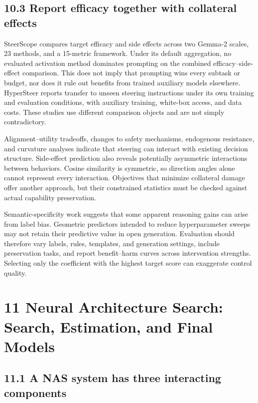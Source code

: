 \subsection*{10.3 Report efficacy together with collateral effects}

SteerScope compares target efficacy and side effects across two Gemma-2 scales, 23 methods, and a 15-metric framework.\cite{r87} Under its default aggregation, no evaluated activation method dominates prompting on the combined efficacy–side-effect comparison. This does not imply that prompting wins every subtask or budget, nor does it rule out benefits from trained auxiliary models elsewhere. HyperSteer reports transfer to unseen steering instructions under its own training and evaluation conditions, with auxiliary training, white-box access, and data costs.\cite{r110} These studies use different comparison objects and are not simply contradictory.


Alignment–utility tradeoffs, changes to safety mechanisms, endogenous resistance, and curvature analyses indicate that steering can interact with existing decision structure.\cite{r96,r111,r119,r129} Side-effect prediction also reveals potentially asymmetric interactions between behaviors.\cite{r126} Cosine similarity is symmetric, so direction angles alone cannot represent every interaction. Objectives that minimize collateral damage offer another approach, but their constrained statistics must be checked against actual capability preservation.\cite{r123}


Semantic-specificity work suggests that some apparent reasoning gains can arise from label bias.\cite{r127} Geometric predictors intended to reduce hyperparameter sweeps may not retain their predictive value in open generation.\cite{r130} Evaluation should therefore vary labels, rules, templates, and generation settings, include preservation tasks, and report benefit–harm curves across intervention strengths. Selecting only the coefficient with the highest target score can exaggerate control quality.


\section*{11 Neural Architecture Search: Search, Estimation, and Final Models}

\subsection*{11.1 A NAS system has three interacting components}

